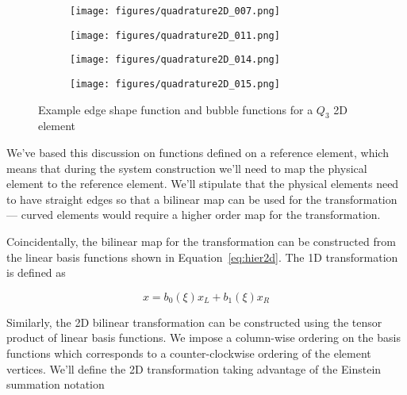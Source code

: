 \documentclass[11pt]{style/memo}
\begin{document}
\begin{figure}[h]
    \centering
    \begin{subfigure}[b]{0.49\textwidth}
        \centering
        \texttt{[image: figures/quadrature2D\_007.png]}
    \end{subfigure}
    \hfill
    \begin{subfigure}[b]{0.49\textwidth}
        \centering
        \texttt{[image: figures/quadrature2D\_011.png]}
    \end{subfigure}

    \begin{subfigure}[b]{0.49\textwidth}
        \centering
        \texttt{[image: figures/quadrature2D\_014.png]}
    \end{subfigure}
    \hfill
    \begin{subfigure}[b]{0.49\textwidth}
        \centering
        \texttt{[image: figures/quadrature2D\_015.png]}
    \end{subfigure}
    \caption{Example edge shape function and bubble functions for a $Q_3$ 2D element}
    \label{fig:hier2d_q3}
\end{figure}

We've based this discussion on functions defined on a reference element, which means
that during the system construction we'll need to map the physical element to the
reference element. We'll stipulate that the physical elements need to have straight
edges so that a bilinear map can be used for the transformation --- curved elements
would require a higher order map for the transformation.

Coincidentally, the bilinear map for the transformation can be constructed from the
linear basis functions shown in Equation~\ref{eq:hier2d}. The 1D transformation is
defined as

\begin{equation}
    x = b_0(\xi) x_L + b_1(\xi) x_R
\end{equation}

Similarly, the 2D bilinear transformation can be constructed using the tensor product
of linear basis functions. We impose a column-wise ordering on the basis functions
which corresponds to a counter-clockwise ordering of the element vertices. We'll define
the 2D transformation taking advantage of the Einstein summation notation
\end{document}
